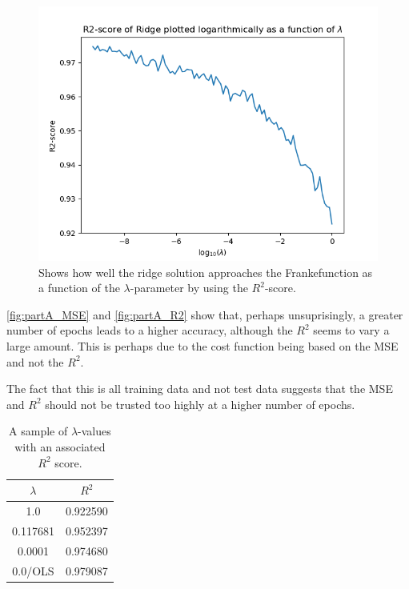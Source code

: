 \documentclass[a4paper, UKenglish]{article}
\newcommand{\0}{\mathbf{0}}
\newcommand{\1}{\mathbf{1}}
\begin{document}
\begin{figure}[H]
        \centering 
        \includegraphics[scale=0.7]{images/partA_ridge.png} 
        \caption{Shows how well the ridge solution approaches the Frankefunction as a function of the $\lambda$-parameter by using the $R^2$-score.}
        \label{fig:partA_ridge}
\end{figure}

\autoref{fig:partA_MSE} and \autoref{fig:partA_R2} show that, perhaps unsuprisingly, a greater number of epochs leads to a higher accuracy, although the $R^2$ seems to vary a large amount. This is perhaps due to the cost function being based on the MSE and not the $R^2$.

The fact that this is all training data and not test data suggests that the MSE and $R^2$ should not be trusted too highly at a higher number of epochs.



\begin{table}[H] 
\centering
\caption{A sample of $\lambda$-values with an associated $R^2$ score.}
\label{tab:Ridge performance}
\begin{tabular}{|c|c|}
  \hline
  $\lambda$ & $R^2$ \\
  \hline
  1.0 & 0.922590 \\
  0.117681 & 0.952397 \\
  0.0001 & 0.974680 \\
  0.0/OLS & 0.979087 \\
  \hline
\end{tabular}
\end{table}
\end{document}

